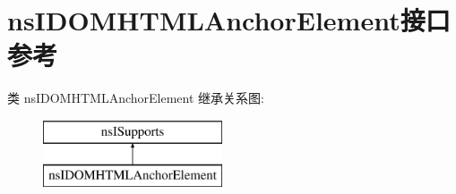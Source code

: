 \hypertarget{interfacens_i_d_o_m_h_t_m_l_anchor_element}{}\section{ns\+I\+D\+O\+M\+H\+T\+M\+L\+Anchor\+Element接口 参考}
\label{interfacens_i_d_o_m_h_t_m_l_anchor_element}
类 ns\+I\+D\+O\+M\+H\+T\+M\+L\+Anchor\+Element 继承关系图\+:\begin{figure}[H]
\begin{center}
\leavevmode
\includegraphics[height=2.000000cm]{interfacens_i_d_o_m_h_t_m_l_anchor_element}
\end{center}
\end{figure}
